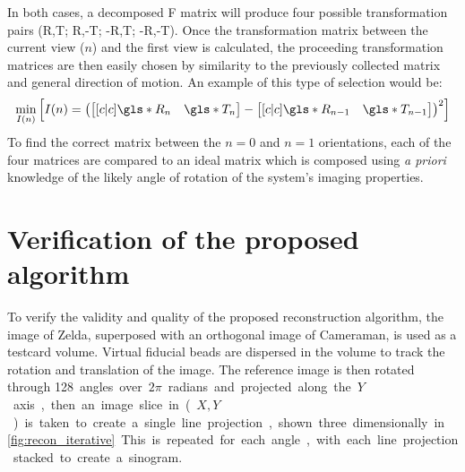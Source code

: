 \documentclass{osa-article}
\begin{document}
In both cases, a decomposed \gls*{F} matrix will produce four possible transformation pairs (\gls*{R},\gls*{T}; \gls*{R},-\gls*{T}; -\gls*{R},\gls*{T}; -\gls*{R},-\gls*{T}).
Once the transformation matrix between the current view (\(n\)) and the first view is calculated, the proceeding transformation matrices are then easily chosen by similarity to the previously collected matrix and general direction of motion.
An example of this type of selection would be:
\begin{align}
  \min_{I(n)}\left[I(n) = \left(\begin{bmatrix}[c|c] \gls*{R}_n&\gls*{T}_n \end{bmatrix} - \begin{bmatrix}[c|c] \gls*{R}_{n-1}&\gls*{T}_{n-1} \end{bmatrix}\right)^2\right]
\end{align}
To find the correct matrix between the \(n=0\) and \(n=1\) orientations, each of the four matrices are compared to an ideal matrix which is composed using \emph{a priori} knowledge of the likely angle of rotation of the system's imaging properties.

\section*{Verification of the proposed algorithm}

To verify the validity and quality of the proposed reconstruction algorithm, the image of Zelda, superposed with an orthogonal image of Cameraman, is used as a testcard volume.
Virtual fiducial beads are dispersed in the volume to track the rotation and translation of the image.%
The reference image is then rotated through \SI{128} angles over \(2\pi \) radians and projected along the \(Y\) axis, then an image slice in (\(X,Y\)) is taken to create a single line projection, shown three dimensionally in \figurename~\ref{fig:recon_iterative}.
This is repeated for each angle,  with each line projection stacked to create a sinogram.%

\end{document}
